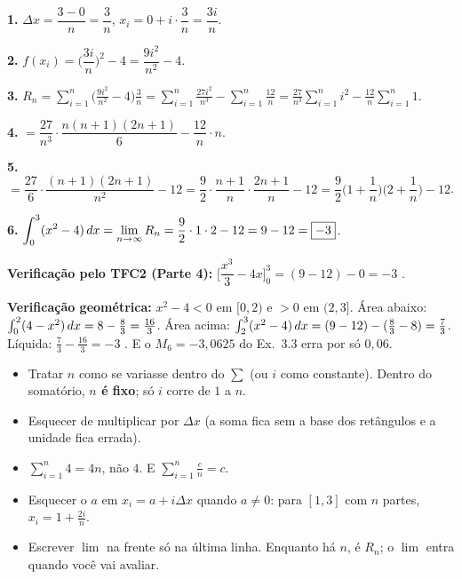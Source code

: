 \begin{exemplo}
\textbf{1.} $\Delta x=\dfrac{3-0}{n}=\dfrac3n$, \quad $x_i=0+i\cdot\dfrac3n=\dfrac{3i}{n}$.

\textbf{2.} $f(x_i)=\Big(\dfrac{3i}{n}\Big)^2-4=\dfrac{9i^2}{n^2}-4$.

\textbf{3.} $R_n=\displaystyle\sum_{i=1}^n\Big(\frac{9i^2}{n^2}-4\Big)\frac3n
=\sum_{i=1}^n\frac{27i^2}{n^3}-\sum_{i=1}^n\frac{12}{n}
=\frac{27}{n^3}\sum_{i=1}^n i^2-\frac{12}{n}\sum_{i=1}^n 1 .$

\textbf{4.} $=\dfrac{27}{n^3}\cdot\dfrac{n(n+1)(2n+1)}{6}-\dfrac{12}{n}\cdot n$.

\textbf{5.} $=\dfrac{27}{6}\cdot\dfrac{(n+1)(2n+1)}{n^2}-12=\dfrac92\cdot\dfrac{n+1}{n}\cdot\dfrac{2n+1}{n}-12=\dfrac92\Big(1+\dfrac1n\Big)\Big(2+\dfrac1n\Big)-12$.

\textbf{6.} $\displaystyle\int_0^3(x^2-4)\,dx=\lim_{n\to\infty}R_n=\frac92\cdot 1\cdot 2-12=9-12=\boxed{-3}$.

\textbf{Verificação pelo TFC2 (Parte 4):} $\Big[\dfrac{x^3}{3}-4x\Big]_0^3=(9-12)-0=-3$ \ok.

\textbf{Verificação geométrica:} $x^2-4<0$ em $[0,2)$ e $>0$ em $(2,3]$. Área abaixo: $\int_0^2(4-x^2)\,dx=8-\tfrac83=\tfrac{16}{3}$. Área acima: $\int_2^3(x^2-4)\,dx=(9-12)-(\tfrac83-8)=\tfrac73$. Líquida: $\tfrac73-\tfrac{16}3=-3$ \ok. E o $M_6=-3{,}0625$ do Ex.~3.3 erra por só $0{,}06$.
\end{exemplo}

\begin{armadilha}
\begin{itemize}[leftmargin=1.4em, itemsep=1pt]
\item Tratar $n$ como se variasse dentro do $\sum$ (ou $i$ como constante). Dentro do somatório, \textbf{$n$ é fixo}; só $i$ corre de $1$ a $n$.
\item Esquecer de multiplicar por $\Delta x$ (a soma fica sem a base dos retângulos e a unidade fica errada).
\item $\sum_{i=1}^n 4 = 4n$, não $4$. E $\sum_{i=1}^n \frac{c}{n}=c$.
\item Esquecer o $a$ em $x_i=a+i\Delta x$ quando $a\neq 0$: para $[1,3]$ com $n$ partes, $x_i=1+\frac{2i}{n}$.
\item Escrever $\lim$ na frente só na última linha. Enquanto há $n$, é $R_n$; o $\lim$ entra quando você vai avaliar.
\end{itemize}
\end{armadilha}

